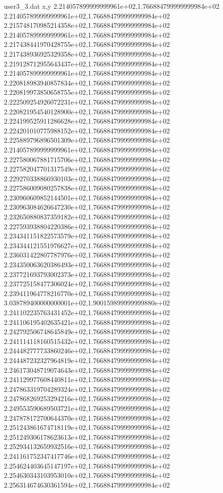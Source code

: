 \begin{filecontents}{user3_3.dat}
x,y
2.214057899999999961e+02,1.766884799999999984e+02
2.214057899999999961e+02,1.766884799999999984e+02
2.215748170985214358e+02,1.766884799999999984e+02
2.214057899999999961e+02,1.766884799999999984e+02
2.217438441970428755e+02,1.766884799999999984e+02
2.217438936925329358e+02,1.766884799999999984e+02
2.219128712955643437e+02,1.766884799999999984e+02
2.214057899999999961e+02,1.766884799999999984e+02
2.220818983940857834e+02,1.766884799999999984e+02
2.220819973850658755e+02,1.766884799999999984e+02
2.222509254926072231e+02,1.766884799999999984e+02
2.220821954540128900e+02,1.766884799999999984e+02
2.224199525911286628e+02,1.766884799999999984e+02
2.224201010775988152e+02,1.766884799999999984e+02
2.225889796896501309e+02,1.766884799999999984e+02
2.214057899999999961e+02,1.766884799999999984e+02
2.227580067881715706e+02,1.766884799999999984e+02
2.227582047701317549e+02,1.766884799999999984e+02
2.229270338866930103e+02,1.766884799999999984e+02
2.227586009080257838e+02,1.766884799999999984e+02
2.230960609852144501e+02,1.766884799999999984e+02
2.230963084626647230e+02,1.766884799999999984e+02
2.232650880837359182e+02,1.766884799999999984e+02
2.227593938804220386e+02,1.766884799999999984e+02
2.234341151822573579e+02,1.766884799999999984e+02
2.234344121551976627e+02,1.766884799999999984e+02
2.236031422807787976e+02,1.766884799999999984e+02
2.234350063620386493e+02,1.766884799999999984e+02
2.237721693793002373e+02,1.766884799999999984e+02
2.237725158477306024e+02,1.766884799999999984e+02
2.239411964778216770e+02,1.766884799999999984e+02
3.038789400000000001e+02,1.900159899999999880e+02
2.241102235763431452e+02,1.766884799999999984e+02
2.241106195402635421e+02,1.766884799999999984e+02
2.242792506748645849e+02,1.766884799999999984e+02
2.241114118160515432e+02,1.766884799999999984e+02
2.244482777733860246e+02,1.766884799999999984e+02
2.244487232327964819e+02,1.766884799999999984e+02
2.246173048719074643e+02,1.766884799999999984e+02
2.241129977608440811e+02,1.766884799999999984e+02
2.247863319704289324e+02,1.766884799999999984e+02
2.247868269253294216e+02,1.766884799999999984e+02
2.249553590689503721e+02,1.766884799999999984e+02
2.247878172700644370e+02,1.766884799999999984e+02
2.251243861674718119e+02,1.766884799999999984e+02
2.251249306178623613e+02,1.766884799999999984e+02
2.252934132659932516e+02,1.766884799999999984e+02
2.241161752347417746e+02,1.766884799999999984e+02
2.254624403645147197e+02,1.766884799999999984e+02
2.254630343103953010e+02,1.766884799999999984e+02
2.256314674630361594e+02,1.766884799999999984e+02

\end{filecontents}
